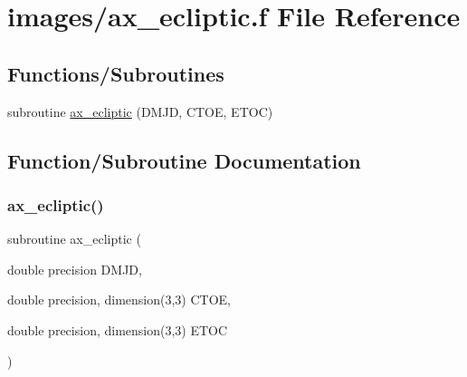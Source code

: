 \hypertarget{ax__ecliptic_8f}{}\section{images/ax\+\_\+ecliptic.f File Reference}
\label{ax__ecliptic_8f}
\subsection*{Functions/\+Subroutines}
\begin{DoxyCompactItemize}
\item 
subroutine \hyperlink{ax__ecliptic_8f_a694387520693b0cf78307eca9f38238e}{ax\+\_\+ecliptic} (D\+M\+JD, C\+T\+OE, E\+T\+OC)
\end{DoxyCompactItemize}


\subsection{Function/\+Subroutine Documentation}
\mbox{\label{ax__ecliptic_8f_a694387520693b0cf78307eca9f38238e}} 
\subsubsection{\texorpdfstring{ax\+\_\+ecliptic()}{ax\_ecliptic()}}
{\footnotesize\ttfamily subroutine ax\+\_\+ecliptic (\begin{DoxyParamCaption}\item[{double precision}]{D\+M\+JD,  }\item[{double precision, dimension(3,3)}]{C\+T\+OE,  }\item[{double precision, dimension(3,3)}]{E\+T\+OC }\end{DoxyParamCaption})}

